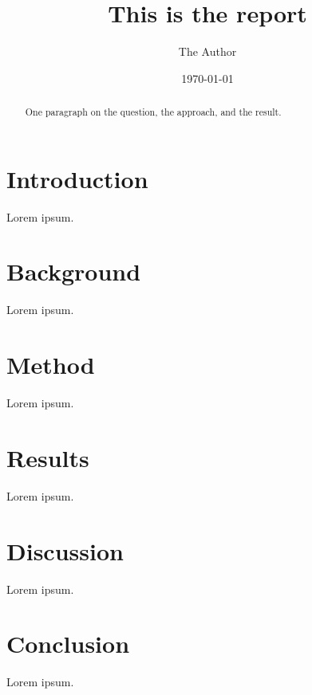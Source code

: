 \documentclass[11pt,a4paper]{report}
\title{This is the report}
\author{The Author}
\date{\today}
\begin{document}
\maketitle

\begin{abstract}
One paragraph on the question, the approach, and the result.
\end{abstract}

\tableofcontents
\listoffigures
\listoftables


\chapter{Introduction}

Lorem ipsum.

\chapter{Background}

Lorem ipsum.

\chapter{Method}

Lorem ipsum.

\chapter{Results}


Lorem ipsum.

\chapter{Discussion}

Lorem ipsum.

\chapter{Conclusion}

Lorem ipsum.


% 
% 
\end{document}
